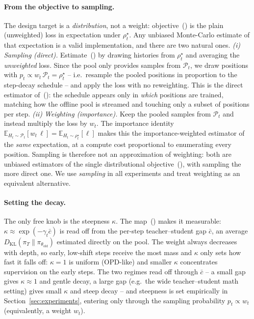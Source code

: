 \paragraph{From the objective to sampling.}
The design target is a \emph{distribution}, not a weight: objective~()
is the plain (unweighted) loss in expectation under \(\rho_t^\star\). Any unbiased
Monte-Carlo estimate of that expectation is a valid implementation, and there are two
natural ones.
\emph{(i) Sampling (direct).} Estimate~() by drawing histories
from \(\rho_t^\star\) and averaging the \emph{unweighted} loss. Since the pool only
provides samples from \(\mathcal P_t\), we draw positions with
\(p_t\propto w_t\,\mathcal P_t=\rho_t^\star\) -- i.e.\ resample the pooled positions in
proportion to the step-decay schedule -- and apply the loss with no reweighting. This
is the direct estimator of~(): the schedule appears only in
\emph{which} positions are trained, matching how the offline pool is streamed and
touching only a subset of positions per step.
\emph{(ii) Weighting (importance).} Keep the pooled samples from \(\mathcal P_t\) and
instead multiply the loss by \(w_t\). The importance identity
\(\mathbb E_{H_t\sim\mathcal P_t}[w_t\,\ell]=\mathbb E_{H_t\sim\rho_t^\star}[\ell]\)
makes this the importance-weighted estimator of the \emph{same} expectation, at a
compute cost proportional to enumerating every position.
Sampling is therefore not an approximation of weighting: both are unbiased estimators
of the single distributional objective~(), with sampling the more
direct one. We use \emph{sampling} in all experiments and treat weighting as an
equivalent alternative.

\paragraph{Setting the decay.}
The only free knob is the steepness \(\kappa\). The map~()
makes it measurable: \(\kappa\approx\exp(-\gamma_t\bar c)\) is read off from the
per-step teacher--student gap \(\bar c\), an average
\(D_{\mathrm{KL}}(\pi_T\|\pi_{\theta_{\mathrm{old}}})\) estimated directly on the pool.
The weight always decreases with depth, so early, low-shift steps receive the most
mass and \(\kappa\) only sets how fast it falls off: \(\kappa\!=\!1\) is uniform
(OPD-like) and smaller \(\kappa\) concentrates supervision on the early steps. The two
regimes read off through \(\bar c\) -- a small gap gives \(\kappa\!\approx\!1\) and
gentle decay, a large gap (e.g.\ the wide teacher--student math setting) gives small
\(\kappa\) and steep decay -- and steepness is set empirically in
Section~\ref{sec:experiments}, entering only through the sampling probability
\(p_t\propto w_t\) (equivalently, a weight \(w_t\)).

